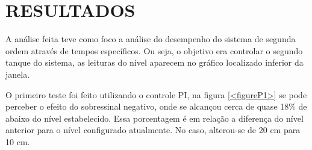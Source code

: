 \documentclass[a4paper,12pt]{article}
\begin{document}
\newpage


\thispagestyle{main}

\section{RESULTADOS}

\hspace{4ex}A análise feita teve como foco a análise do desempenho do sistema de segunda ordem através de tempos específicos. Ou seja, o objetivo era controlar o segundo tanque do sistema, as leituras do nível aparecem no gráfico localizado inferior da janela.

\hspace{4ex}O primeiro teste foi feito utilizando o controle PI, na figura \ref{<figureP1>} se pode perceber o efeito do sobressinal negativo, onde se alcançou cerca de quase 18\% de  abaixo do nível estabelecido. Essa porcentagem é em relação a diferença do nível anterior para o nível configurado atualmente. No caso, alterou-se de 20 cm para 10 cm.
\end{document}
